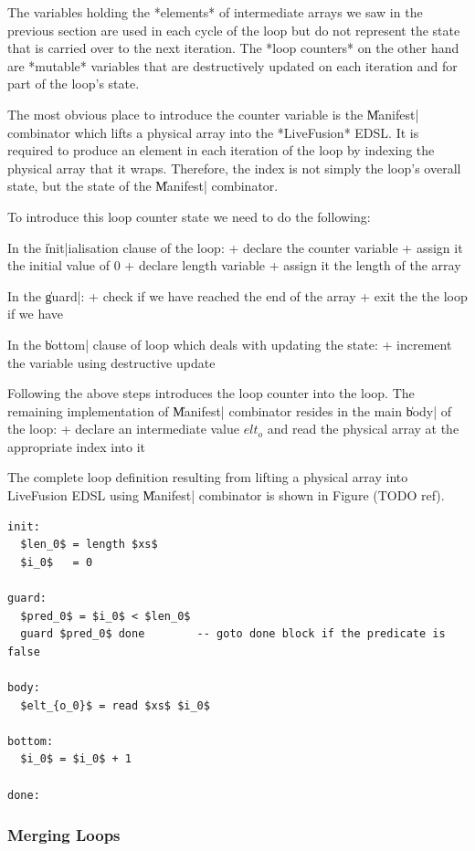 \documentclass[preamble.tex]{subfiles}
\begin{document}
The variables holding the *elements* of intermediate arrays we saw in the previous section are used in each cycle of the loop but do not represent the state that is carried over to the next iteration. The *loop counters* on the other hand are *mutable* variables that are destructively updated on each iteration and for part of the loop's state.

The most obvious place to introduce the counter variable is the \|Manifest| combinator which lifts a physical array into the *LiveFusion* EDSL. It is required to produce an element in each iteration of the loop by indexing the physical array that it wraps. Therefore, the index is not simply the loop's overall state, but the state of the \|Manifest| combinator.

To introduce this loop counter state we need to do the following:

In the \|init|ialisation clause of the loop:
+ declare the counter variable
+ assign it the initial value of 0
+ declare length variable
+ assign it the length of the array

In the \|guard|:
+ check if we have reached the end of the array
+ exit the the loop if we have

In the \|bottom| clause of loop which deals with updating the state:
+ increment the variable using destructive update

Following the above steps introduces the loop counter into the loop. The remaining implementation of \|Manifest| combinator resides in the main \|body| of the loop:
+ declare an intermediate value $elt_o$ and read the physical array at the appropriate index into it

The complete loop definition resulting from lifting a physical array into LiveFusion EDSL using \|Manifest| combinator is shown in Figure (TODO ref).

\begin{lstlisting}[mathescape]
init:
  $len_0$ = length $xs$
  $i_0$   = 0

guard:
  $pred_0$ = $i_0$ < $len_0$
  guard $pred_0$ done        -- goto done block if the predicate is false

body:
  $elt_{o_0}$ = read $xs$ $i_0$

bottom:
  $i_0$ = $i_0$ + 1

done:

\end{lstlisting}


\subsubsection{Merging Loops}
\end{document}
